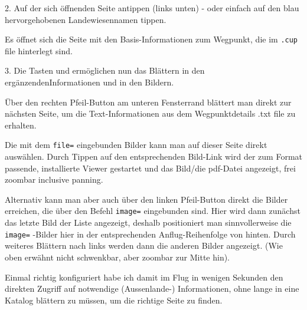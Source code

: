 
2. Auf der sich öffnenden Seite  antippen (links unten) - oder einfach auf den blau hervorgehobenen Landewiesennamen tippen.


Es öffnet sich die Seite mit den Basis-Informationen zum Wegpunkt, die im \verb|.cup| file hinterlegt sind.


3. Die Tasten \button{$<$} und \button{$>$} ermöglichen nun das Blättern in den ergänzendenInformationen und in den Bildern.

Über den rechten Pfeil-Button \button{$>$} am unteren Fensterrand blättert man direkt zur nächsten Seite, um die Text-Informationen aus dem Wegpunktdetails .txt file zu erhalten.  


Die mit dem \verb|file=| eingebunden Bilder kann man auf dieser Seite direkt auswählen. Durch Tippen auf den entsprechenden Bild-Link wird der zum Format passende, installierte Viewer gestartet und das Bild/die pdf-Datei angezeigt, frei zoombar inclusive panning.


Alternativ kann man aber auch über den linken Pfeil-Button \button{$<$} direkt die Bilder erreichen, die über den Befehl \verb|image=| eingebunden sind. Hier wird dann zunächst das letzte Bild der Liste angezeigt, deshalb positioniert man sinnvollerweise die \verb|image=| -Bilder hier in der entsprechenden Anflug-Reihenfolge von hinten. Durch weiteres Blättern nach links werden dann die anderen Bilder angezeigt. (Wie oben erwähnt nicht schwenkbar, aber zoombar zur Mitte hin).


Einmal richtig konfiguriert habe ich damit im Flug in wenigen Sekunden den direkten Zugriff auf notwendige (Aussenlande-) Informationen, ohne lange in eine Katalog blättern zu müssen, um die richtige Seite zu finden.   









